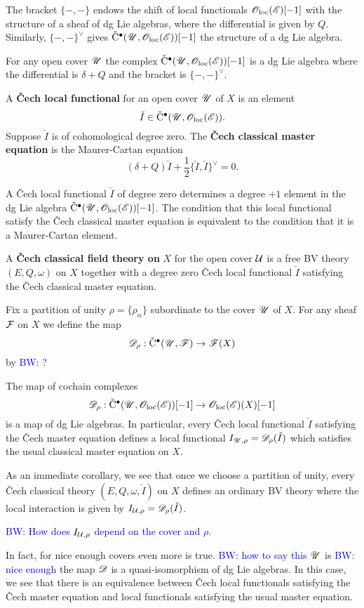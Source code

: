 \documentclass[11pt]{amsart}
\numberwithin{equation}{section}
\def\brian{\textcolor{blue}{BW: }\textcolor{blue}}
\def\vC{{\rm\check{C}}}
\def\vI{\check{I}}
\begin{document}
The bracket $\{-,-\}$ endows the shift of local functionals ${\mathscr O}_{\rm loc} (\mathscr E)[-1]$ with the structure of a sheaf of dg Lie algebras, where the differential is given by $Q$. 
Similarly, $\{-,-\}^{\vee}$ gives $\vC^\bu(\sU, \oloc(\sE))[-1]$ the structure of a dg Lie algebra.

\begin{lem}
For any open cover $\mathscr U$ the complex $\vC^\bu(\sU, \oloc(\sE))[-1]$ is a dg Lie algebra where the differential is $\delta + Q$ and the bracket is $\{-,-\}^\vee$. 
\end{lem}

\begin{dfn}
A {\bf \v{C}ech local functional} for an open cover $\mathscr U$ of $X$ is an element 
\[
\vI \in \vC^\bu (\sU , \oloc(\sE)) .
\]
Suppose $\vI$ is of cohomological degree zero.
The {\bf \v{C}ech classical master equation} is the Maurer-Cartan equation
\[
(\delta + Q) \vI + \frac{1}{2} \{\vI,\vI\}^{\vee} = 0 .
\] 
\end{dfn}

A \v{C}ech local functional $\vI$ of degree zero determines a degree $+1$ element in the dg Lie algebra $\vC^\bu(\sU, \oloc(\sE))[-1]$. 
The condition that this local functional satisfy the \v{C}ech classical master equation is equivalent to the condition that it is a Maurer-Cartan element. 

\begin{dfn}
A {\bf \v{C}ech classical field theory on} $X$ for the open cover $\mathcal U$ is a free BV theory $(E, Q, \omega)$ on $X$ together with a degree zero \v{C}ech local functional $\vI$ satisfying the \v{C}ech classical master equation. 
\end{dfn}

Fix a partition of unity $\rho = \{\rho_\alpha\}$ subordinate to the cover $\mathscr U$ of $X$. 
For any sheaf $\mathcal F$ on $X$ we define the map
\[
\sD_{\rho} : \vC^\bu(\sU , \sF) \to \sF(X) 
\]
by \brian{?}

\begin{lem}
The map of cochain complexes
\[
\sD_{\rho} : \vC^\bu(\sU, \oloc(\sE))[-1] \to \oloc(\sE)(X)[-1]
\]
is a map of dg Lie algebras. 
In particular, every \v{C}ech local functional $\vI$ satisfying the \v{C}ech master equation defines a local functional $I_{\sU, \rho} = \sD_\rho(\vI)$ which satisfies the usual classical master equation on $X$. 
\end{lem}

As an immediate corollary, we see that once we choose a partition of unity, every \v{C}ech classical theory $(E, Q, \omega, \vI)$ on $X$ defines an ordinary BV theory where the local interaction is given by $I_{\cU, \rho} = \sD_{\rho} (\vI)$. 

\begin{lem}
\brian{How does $I_{\mathcal U,\rho}$ depend on the cover and $\rho$.}
\end{lem}

In fact, for nice enough covers even more is true.
\brian{how to say this} $\mathscr U$ is \brian{nice enough} the map $\mathscr D$ is a quasi-isomorphism of dg Lie algebras.
In this case, we see that there is an equivalence between \v{C}ech local functionals satisfying the \v{C}ech master equation and local functionals satisfying the usual master equation. 
\end{document}
